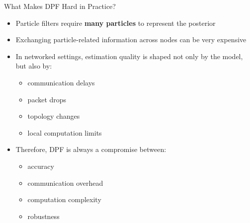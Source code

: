 \documentclass[aspectratio=169]{beamer}
\begin{document}




\begin{frame}{What Makes DPF Hard in Practice?}

\begin{itemize}
    \item Particle filters require \textbf{many particles} to represent the posterior
    \item Exchanging particle-related information across nodes can be very expensive
    \item In networked settings, estimation quality is shaped not only by the model, but also by:
    \begin{itemize}
        \item communication delays
        \item packet drops
        \item topology changes
        \item local computation limits
    \end{itemize}
    \item Therefore, DPF is always a compromise between:
    \begin{itemize}
        \item accuracy
        \item communication overhead
        \item computation complexity
        \item robustness
    \end{itemize}
\end{itemize}

\end{frame}

\end{document}
